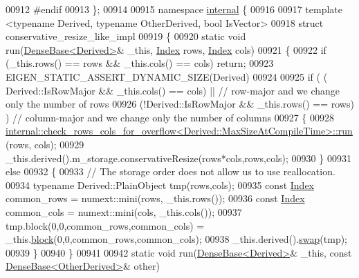 \begin{DoxyCode}
00912 \textcolor{preprocessor}{#endif}
00913 \};
00914 
00915 \textcolor{keyword}{namespace }\hyperlink{namespaceinternal}{internal} \{
00916 
00917 \textcolor{keyword}{template} <\textcolor{keyword}{typename} Derived, \textcolor{keyword}{typename} OtherDerived, \textcolor{keywordtype}{bool} IsVector>
00918 \textcolor{keyword}{struct }conservative\_resize\_like\_impl
00919 \{
00920   \textcolor{keyword}{static} \textcolor{keywordtype}{void} run(\hyperlink{group___core___module_class_eigen_1_1_dense_base}{DenseBase<Derived>}& \_this, \hyperlink{namespace_eigen_a62e77e0933482dafde8fe197d9a2cfde}{Index} rows, 
      \hyperlink{namespace_eigen_a62e77e0933482dafde8fe197d9a2cfde}{Index} cols)
00921   \{
00922     \textcolor{keywordflow}{if} (\_this.rows() == rows && \_this.cols() == cols) \textcolor{keywordflow}{return};
00923     EIGEN\_STATIC\_ASSERT\_DYNAMIC\_SIZE(Derived)
00924 
00925     \textcolor{keywordflow}{if} ( ( Derived::IsRowMajor && \_this.cols() == cols) || \textcolor{comment}{// row-major and we change only the number of
       rows}
00926          (!Derived::IsRowMajor && \_this.rows() == rows) )  \textcolor{comment}{// column-major and we change only the number of
       columns}
00927     \{
00928       \hyperlink{struct_eigen_1_1internal_1_1check__rows__cols__for__overflow}{internal::check\_rows\_cols\_for\_overflow<Derived::MaxSizeAtCompileTime>::run}
      (rows, cols);
00929       \_this.derived().m\_storage.conservativeResize(rows*cols,rows,cols);
00930     \}
00931     \textcolor{keywordflow}{else}
00932     \{
00933       \textcolor{comment}{// The storage order does not allow us to use reallocation.}
00934       \textcolor{keyword}{typename} Derived::PlainObject tmp(rows,cols);
00935       \textcolor{keyword}{const} \hyperlink{namespace_eigen_a62e77e0933482dafde8fe197d9a2cfde}{Index} common\_rows = numext::mini(rows, \_this.rows());
00936       \textcolor{keyword}{const} \hyperlink{namespace_eigen_a62e77e0933482dafde8fe197d9a2cfde}{Index} common\_cols = numext::mini(cols, \_this.cols());
00937       tmp.block(0,0,common\_rows,common\_cols) = \_this.\hyperlink{group___core___module_ab8e42e67c5cfd5fa13e684642f0f65bf}{block}(0,0,common\_rows,common\_cols);
00938       \_this.derived().\hyperlink{group___core___module_ab420d9d588ac443f5a1b1a7dceb12c90}{swap}(tmp);
00939     \}
00940   \}
00941 
00942   \textcolor{keyword}{static} \textcolor{keywordtype}{void} run(\hyperlink{group___core___module_class_eigen_1_1_dense_base}{DenseBase<Derived>}& \_this, \textcolor{keyword}{const} 
      \hyperlink{group___core___module_class_eigen_1_1_dense_base}{DenseBase<OtherDerived>}& other)

\end{DoxyCode}
